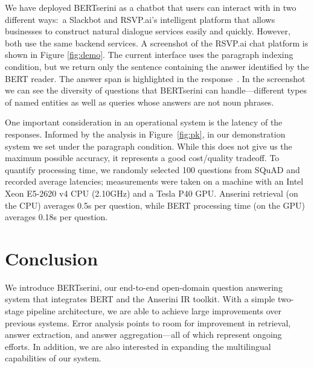 \documentclass[11pt,a4paper]{article}
\begin{document}
We have deployed BERTserini as a chatbot that users can interact with in two different ways:\ a Slackbot and RSVP.ai's intelligent platform that allows businesses to construct natural dialogue services easily and quickly.
However, both use the same backend services.
A screenshot of the RSVP.ai chat platform is shown in Figure \ref{fig:demo}.
The current interface uses the paragraph indexing condition, but we return only the sentence containing the answer identified by the BERT reader.
The answer span is highlighted in the response~\cite{Lin_etal_CHI2003}.
In the screenshot we can see the diversity of questions that BERTserini can handle---different types of named entities as well as queries whose answers are not noun phrases.

One important consideration in an operational system is the latency of the responses.
Informed by the analysis in Figure~\ref{fig:pk}, in our demonstration system we set  under the paragraph condition.
While this does not give us the maximum possible accuracy, it represents a good cost/quality tradeoff.
To quantify processing time, we randomly selected 100 questions from SQuAD and recorded average latencies; measurements were taken on a machine with an Intel Xeon E5-2620 v4 CPU (2.10GHz) and a Tesla P40 GPU.
Anserini retrieval (on the CPU) averages 0.5s per question, while BERT processing time (on the GPU) averages 0.18s per question.

\section{Conclusion}

We introduce BERTserini, our end-to-end open-domain question answering system that integrates BERT and the Anserini IR toolkit.
With a simple two-stage pipeline architecture, we are able to achieve large improvements over previous systems.
Error analysis points to room for improvement in retrieval, answer extraction, and answer aggregation---all of which represent ongoing efforts.
In addition, we are also interested in expanding the multilingual capabilities of our system.



\end{document}
